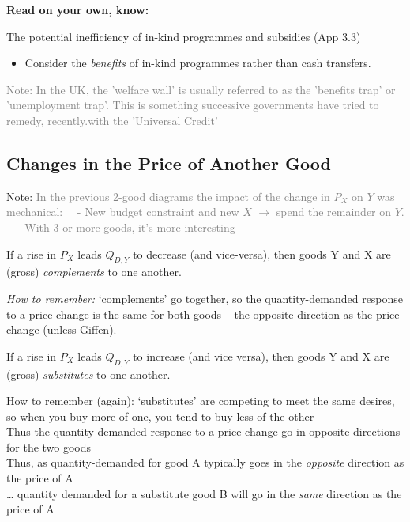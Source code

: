 \documentclass[]{article}
\providecommand{\tightlist}{%
  \setlength{\itemsep}{0pt}\setlength{\parskip}{0pt}}
\begin{document}
\textbf{Read on your own, know:}

The potential inefficiency of in-kind programmes and subsidies (App 3.3)

\begin{itemize}
\tightlist
\item
  Consider the \emph{benefits} of in-kind programmes rather than cash transfers.
\end{itemize}

\textcolor{gray}{Note: In the UK, the 'welfare wall' is usually referred to as the 'benefits trap' or 'unemployment trap'.
This is something successive governments have tried to remedy, recently.with the 'Universal Credit'}

\hypertarget{changes-in-the-price-of-another-good}{%
\subsection{Changes in the Price of Another Good}\label{changes-in-the-price-of-another-good}}

Note: \textcolor{gray}{In the previous 2-good diagrams the impact of the change in $P_X$ on $Y$ was mechanical: \ \
- New budget constraint and new $X$ $\rightarrow$ spend the remainder on $Y$. \ \
- With 3 or more goods, it's more interesting}

\begin{description}
\tightlist
\item[Complements]
If a rise in \(P_X\) leads \(Q_{D,Y}\) to decrease (and vice-versa), then goods Y and X are (gross) \emph{complements} to one another.
\end{description}

\emph{How to remember:} `complements' go together, so the quantity-demanded response to a price change is the same for both goods
-- the opposite direction as the price change (unless Giffen).

\bigskip

\begin{description}
\tightlist
\item[Substitutes]
If a rise in \(P_X\) leads \(Q_{D,Y}\) to increase (and vice versa), then goods Y and X are (gross) \emph{substitutes} to one another.
\end{description}

How to remember (again): `substitutes' are competing to meet the same desires,\\
so when you buy more of one, you tend to buy less of the other\\
Thus the quantity demanded response to a price change go in opposite directions for the two goods\\
Thus, as quantity-demanded for good A typically goes in the \emph{opposite} direction as the price of A\\
\ldots{} quantity demanded for a substitute good B will go in the \emph{same} direction as the price of A
\end{document}
